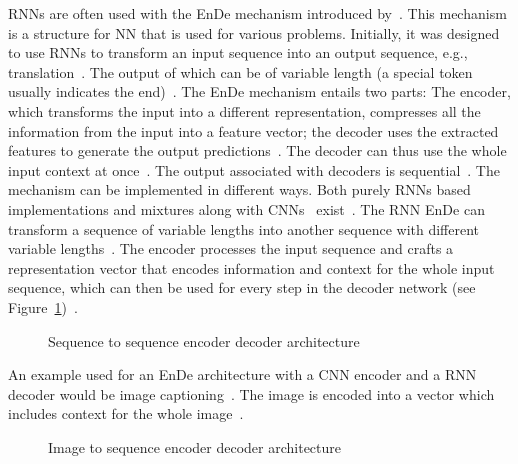 \acp{RNN} are often used with the \ac{EnDe} mechanism introduced by~\cite{cho_learning_2014}.
This mechanism is a structure for \ac{NN} that is used for various problems.
Initially, it was designed to use \acp{RNN} to transform an input sequence into an output sequence,
e.g., translation~\citep{cho_learning_2014}.
The output of which can be of variable length (a special token usually indicates the
end)~\citep{cho_learning_2014,asadi_encoder-decoder_2020}.
The \ac{EnDe} mechanism entails two parts: The encoder, which transforms the input into a
different representation, compresses all the information from the input into a feature vector;
the decoder uses the extracted features to generate the output
predictions~\citep{asadi_encoder-decoder_2020,cho_learning_2014}.
The decoder can thus use the whole input context at once~\citep{asadi_encoder-decoder_2020}.
The output associated with decoders is sequential~\citep{asadi_encoder-decoder_2020}.
The mechanism can be implemented in different ways.
Both purely \acp{RNN} based~\citep{cho_learning_2014} implementations and mixtures along with
\acp{CNN}~\citep{ghosh_visual_2017} exist~\citep{asadi_encoder-decoder_2020}.
The \ac{RNN} \ac{EnDe} can transform a sequence of variable lengths into another
sequence with different variable lengths~\citep{cho_learning_2014}.
The encoder processes the input sequence and crafts a representation vector that encodes information
and context for the whole input sequence, which can then be used for every step in the decoder
network (see Figure~\ref{fig:enc-dec-rnn})~\citep{cho_learning_2014}.
\begin{figure}[h]
    \centering
    \caption[Sequence to sequence encoder decoder architecture]{%
        Sequence to sequence encoder decoder
        architecture~\citep{cho_learning_2014}\label{fig:enc-dec-rnn}
    }
\end{figure}
An example used for an \ac{EnDe} architecture with a \ac{CNN} encoder and a \ac{RNN} decoder
would be image captioning~\citep{asadi_encoder-decoder_2020}.
The image is encoded into a vector which includes context for the whole
image~\citep{asadi_encoder-decoder_2020}.
\begin{figure}[h]
    \centering
    \caption[Image to sequence encoder decoder architecture]{%
        Image to sequence encoder decoder
        architecture~\citep{asadi_encoder-decoder_2020}\label{fig:enc-dec-cnn}
    }
\end{figure}

